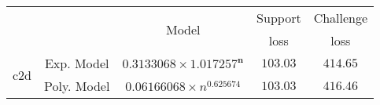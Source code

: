 \begin{tabular}{ccccc} 
\hline 
 &  & \multirow{2}{*}{Model} & Support & Challenge\tabularnewline 
 &  &  & loss  & loss\tabularnewline 
\hline 
\hline 
\multirow{2}{*}{c2d} & Exp. Model & $\mathbf{0.3133068\times 1.017257^{n}}$ & $\mathbf{103.03}$ & $\mathbf{414.65}$ \tabularnewline 
 & Poly. Model & $0.06166068\times n^{0.625674}$ & $103.03$ & $416.46$ \tabularnewline 
\hline 
\end{tabular} 

